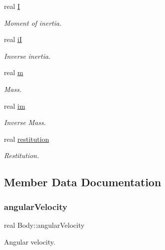 \begin{DoxyCompactItemize}
real \mbox{\hyperlink{struct_body_a48ced797496c1cd5bf4175cfc16c2364}{I}}
\begin{DoxyCompactList}\small\item\em Moment of inertia. \end{DoxyCompactList}\item 
real \mbox{\hyperlink{struct_body_abab39f15217fc548e93a27eeda630c20}{iI}}
\begin{DoxyCompactList}\small\item\em Inverse inertia. \end{DoxyCompactList}\item 
real \mbox{\hyperlink{struct_body_abbf210246f192562bf8809f2b2c3e238}{m}}
\begin{DoxyCompactList}\small\item\em Mass. \end{DoxyCompactList}\item 
real \mbox{\hyperlink{struct_body_a500c28fac5382a812430a095f35d355f}{im}}
\begin{DoxyCompactList}\small\item\em Inverse Mass. \end{DoxyCompactList}\item 
real \mbox{\hyperlink{struct_body_aa57d627e73de706e87540b07b61d867a}{restitution}}
\begin{DoxyCompactList}\small\item\em Restitution. \end{DoxyCompactList}\end{DoxyCompactItemize}


\subsection{Member Data Documentation}
\mbox{\label{struct_body_a78f0f4d1c6a6b9efaefd5a03bd8de598}} 
\subsubsection{\texorpdfstring{angular\+Velocity}{angularVelocity}}
{\footnotesize\ttfamily real Body\+::angular\+Velocity}



Angular velocity. 

\mbox{\label{struct_body_a0399faa61bf3850a1dacb2ed3f377ba5}} 
